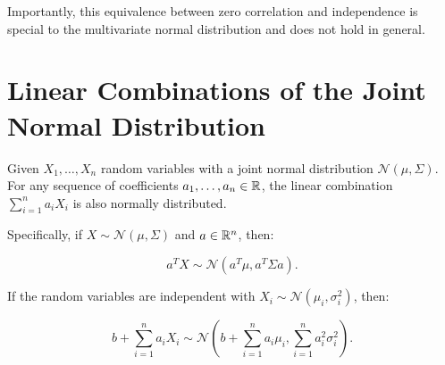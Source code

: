 Importantly, this equivalence between zero correlation and independence is special to the multivariate normal distribution and does not hold in general.

\section{Linear Combinations of the Joint Normal Distribution}

Given \(X_1, \dots, X_n\) random variables with a joint normal distribution \(\mathcal{N}(\mu, \Sigma)\). For any sequence of coefficients \(a_1, \dots, a_n \in \mathbb{R}\), 
the linear combination \(\sum_{i = 1}^{n} a_i X_i\) is also normally distributed.

Specifically, if \(X \sim \mathcal{N}(\mu, \Sigma)\) and \(a \in \mathbb{R}^n\), then:

\[
    a^T X \sim \mathcal{N}(a^T \mu, a^T \Sigma a).
\]

If the random variables are independent with \(X_i \sim \mathcal{N}(\mu_i, \sigma_{i}^{2})\), then:

\[
    b + \sum_{i = 1}^{n} a_i X_i \sim \mathcal{N}\left(b + \sum_{i=1}^{n} a_i \mu_i, \sum_{i = 1}^{n} a_{i}^{2} \sigma_{i}^2\right).
\]
